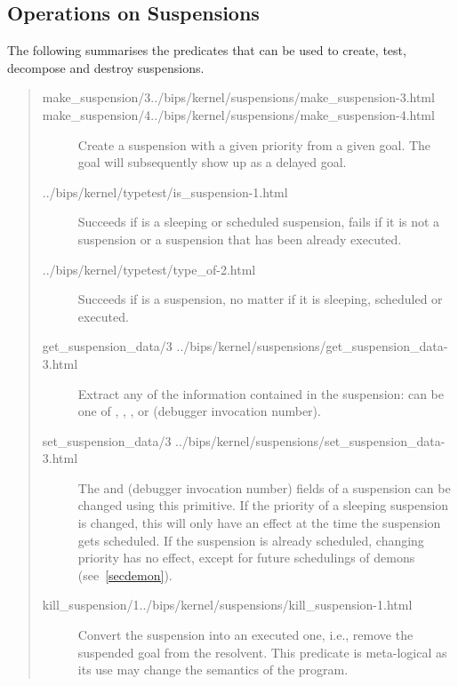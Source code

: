 \subsection{Operations on Suspensions}
The following summarises the predicates that can be used to create, test,
decompose and destroy suspensions.
\begin{quote}
\begin{description}
\item[%
{make_suspension/3}{../bips/kernel/suspensions/make_suspension-3.html}]
\item[%
{make_suspension/4}{../bips/kernel/suspensions/make_suspension-4.html}]
Create a suspension with a given priority from a given goal.
The goal will subsequently show up as a delayed goal.

\item[%
{../bips/kernel/typetest/is_suspension-1.html}]
Succeeds if  is a sleeping or scheduled suspension,
fails if it is not a suspension or a suspension that has been already executed.

\item[%
{../bips/kernel/typetest/type_of-2.html}]
Succeeds if  is a suspension, no matter if it is
sleeping, scheduled or executed.

\item[%
{get_suspension_data/3}%
{../bips/kernel/suspensions/get_suspension_data-3.html}]
Extract any of the information contained in the suspension:
 can be one of
, , ,  or
 (debugger invocation number).


\item[%
{set_suspension_data/3}%
{../bips/kernel/suspensions/set_suspension_data-3.html}]
The  and  (debugger invocation number) fields
of a suspension can be changed using this primitive.
If the priority of a sleeping suspension is changed,
this will only have an effect at the time the suspension gets
scheduled. If the suspension is already scheduled, changing
priority has no effect, except for future schedulings of demons
(see~\ref{secdemon}).


\item[%
{kill_suspension/1}{../bips/kernel/suspensions/kill_suspension-1.html}]
Convert the suspension  into an executed
one, i.e., remove the suspended goal from the resolvent.
This predicate is meta-logical as its use may
change the semantics of the program.
\end{description}
\end{quote}



